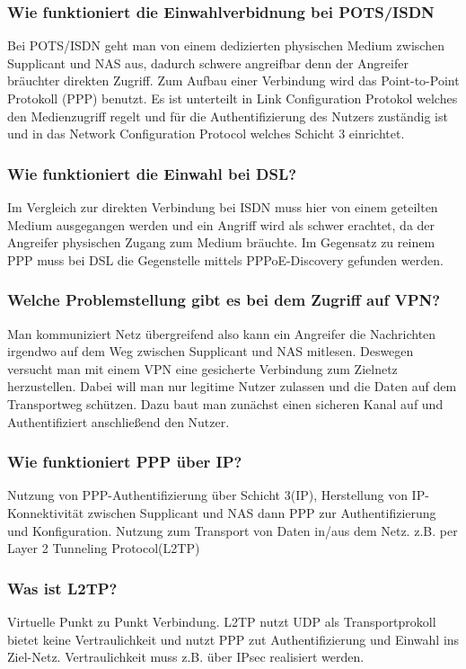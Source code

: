 		\subsubsection{Wie funktioniert die Einwahlverbidnung bei POTS/ISDN}
		Bei POTS/ISDN geht man von einem dedizierten physischen Medium zwischen Supplicant und NAS aus, dadurch schwere angreifbar denn der Angreifer bräuchter direkten Zugriff. Zum Aufbau einer Verbindung wird das Point-to-Point Protokoll (PPP) benutzt. Es ist unterteilt in Link Configuration Protokol welches den Medienzugriff regelt und für die Authentifizierung des Nutzers zuständig ist und in das Network Configuration Protocol welches Schicht 3 einrichtet.
		
		\subsubsection{Wie funktioniert die Einwahl bei DSL?}
		Im Vergleich zur direkten Verbindung bei ISDN muss hier von einem geteilten Medium ausgegangen werden und ein Angriff wird als schwer erachtet, da der Angreifer physischen Zugang zum Medium bräuchte. Im Gegensatz zu reinem PPP muss bei DSL die Gegenstelle mittels PPPoE-Discovery gefunden werden.
		
		\subsubsection{Welche Problemstellung gibt es bei dem Zugriff auf VPN?}
		Man kommuniziert Netz übergreifend also kann ein Angreifer die Nachrichten irgendwo auf dem Weg zwischen Supplicant und NAS mitlesen. Deswegen versucht man mit einem VPN eine gesicherte Verbindung zum Zielnetz herzustellen. Dabei will man nur legitime Nutzer zulassen und die Daten auf dem Transportweg schützen.
		Dazu baut man zunächst einen sicheren Kanal auf und Authentifiziert anschließend den Nutzer.
		
		\subsubsection{Wie funktioniert PPP über IP?}
		Nutzung von PPP-Authentifizierung über Schicht 3(IP), Herstellung von IP-Konnektivität zwischen Supplicant und NAS dann PPP zur Authentifizierung und Konfiguration. Nutzung zum Transport von Daten in/aus dem Netz. z.B. per Layer 2 Tunneling Protocol(L2TP)
		
		\subsubsection{Was ist L2TP?}
		Virtuelle Punkt zu Punkt Verbindung. L2TP nutzt UDP als Transportprokoll bietet keine Vertraulichkeit und nutzt PPP zut Authentifizierung und Einwahl ins Ziel-Netz. Vertraulichkeit muss z.B. über IPsec realisiert werden.
		
